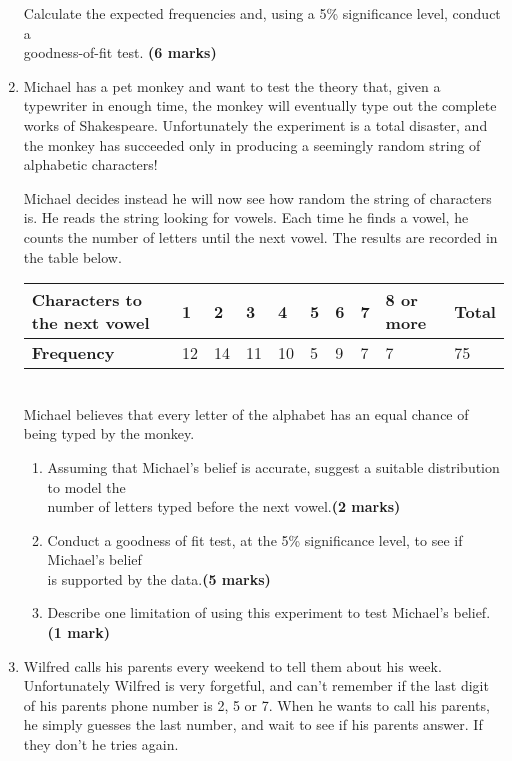 \documentclass[fleqn]{article}
\begin{document}
\begin{enumerate}
        Calculate the expected frequencies and, using a 5\% significance level, conduct a \\goodness-of-fit test. \hfill\textbf{(6 marks)}
    \newpage
    \item Michael has a pet monkey and want to test the theory that, given a typewriter in enough time, the monkey will eventually type out the complete works of Shakespeare. Unfortunately the experiment is a total disaster, and the monkey has succeeded only in producing a seemingly random string of alphabetic characters!
        
        Michael decides instead he will now see how random the string of characters is. He reads the string looking for vowels. Each time he finds a vowel, he counts the number of letters until the next vowel. The results are recorded in the table below.\vspace{3mm}\\
        \begin{tabularx}{0.9\textwidth}{|X|*7{P{7mm}|}P{16mm}|P{12mm}|}
            \hline
            \textbf{Characters to the next vowel} & 1  & 2  & 3  & 4  & 5 & 6 & 7 & 8 or more & \textbf{Total}  \\\hline
            \textbf{Frequency}                    & 12 & 14 & 11 & 10 & 5 & 9 & 7 & 7         & 75              \\\hline
        \end{tabularx}\vspace{3mm}\\

        Michael believes that every letter of the alphabet has an equal chance of being typed by the monkey.
        \begin{enumerate}[label=\bfseries \alph*\space ]
            \item Assuming that Michael's belief is accurate, suggest a suitable distribution to model the \\number of letters typed before the next vowel.\hfill\textbf{(2 marks)}
            \item Conduct a goodness of fit test, at the 5\% significance level, to see if Michael's belief\\ is supported by the data.\hfill\textbf{(5 marks)}
            \item Describe one limitation of using this experiment to test Michael's belief. \hfill\textbf{(1 mark)}
        \end{enumerate}
    \item Wilfred calls his parents every weekend to tell them about his week. Unfortunately Wilfred is very forgetful, and can't remember if the last digit of his parents phone number is 2, 5 or 7. When he wants to call his parents, he simply guesses the last number, and wait to see if his parents answer. If they don't he tries again.
    

\end{enumerate}
\end{document}
